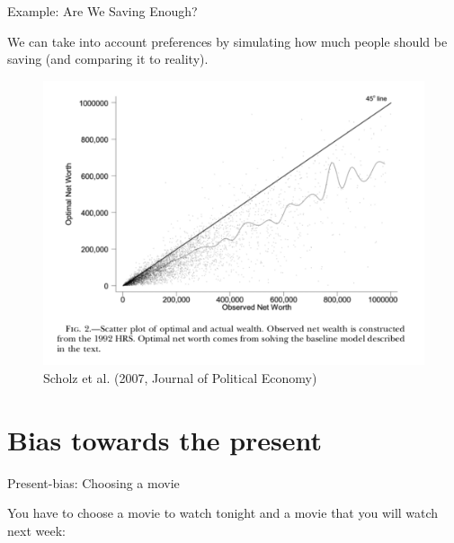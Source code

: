 \documentclass[handout]{beamer}
\begin{document}
\begin{frame}{Example: Are We Saving Enough?}

We can take into account preferences by simulating how much people should be saving (and comparing it to reality).

\begin{figure}
	\includegraphics[scale=0.4]{savings.png}
	\caption{Scholz et al. (2007, Journal of Political Economy)}
\end{figure}


\end{frame}

\section{Bias towards the present}

\begin{frame}{Present-bias: Choosing a movie}

You have to choose a movie to watch tonight and a movie that you will watch next week: 

\begin{figure}

\end{figure}

\end{frame}
\end{document}
